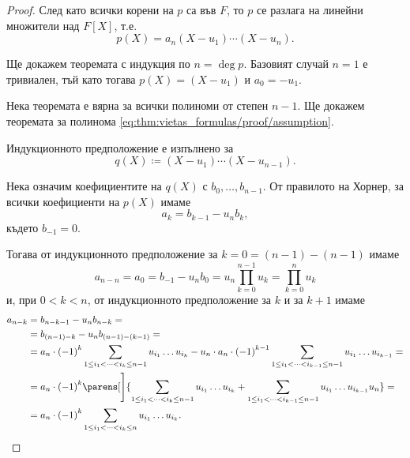 \documentclass{../../common/topic}
\begin{document}
\begin{proof}
  След като всички корени на \( p \) са във \( F \), то \( p \) се разлага на линейни множители над \( F[X] \), т.е.
  \begin{equation}\label{eq:thm:vietas_formulas/proof/assumption}
    p(X) = a_n (X - u_1) \cdots (X - u_n).
  \end{equation}

  Ще докажем теоремата с индукция по \( n = \deg p \). Базовият случай \( n = 1 \) е тривиален, тъй като тогава \( p(X) = (X - u_1) \) и \( a_0 = -u_1 \).

  Нека теоремата е вярна за всички полиноми от степен \( n - 1 \). Ще докажем теоремата за полинома \eqref{eq:thm:vietas_formulas/proof/assumption}.

  Индукционното предположение е изпълнено за
  \begin{equation*}
    q(X) \coloneqq (X - u_1) \cdots (X - u_{n-1}).
  \end{equation*}

  Нека означим коефициентите на \( q(X) \) с \( b_0, \ldots, b_{n-1} \). От правилото на Хорнер, за всички коефициенти на \( p(X) \) имаме
  \begin{equation*}
    a_k = b_{k-1} - u_n b_k,
  \end{equation*}
  където \( b_{-1} = 0 \).

  Тогава от индукционното предположение за \( k = 0 = (n - 1) - (n - 1) \) имаме
  \begin{equation*}
    a_{n-n}
    =
    a_0
    =
    b_{-1} - u_n b_0
    =
    u_n \prod_{k=0}^{n-1} u_k
    =
    \prod_{k=0}^n u_k
  \end{equation*}
  и, при \( 0 < k < n \), от индукционното предположение за \( k \) и за \( k + 1 \) имаме
  \begin{align*}
    a_{n-k}
    &=
    b_{n-k-1} - u_n b_{n-k}
    = \\ &=
    b_{(n-1)-k} - u_n b_{(n-1)-(k-1)}
    = \\ &=
    a_n \cdot {(-1)}^k \sum_{1 \leq i_1 < \cdots < i_k \leq n-1} u_{i_1} \ldots u_{i_k} - u_n \cdot a_n \cdot {(-1)}^{k-1} \sum_{1 \leq i_1 < \cdots < i_{k-1} \leq n-1} u_{i_1} \ldots u_{i_{k-1}}
    = \\ &=
    a_n \cdot {(-1)}^k \parens[\Bigg]{ \sum_{1 \leq i_1 < \cdots < i_k \leq n-1} u_{i_1} \ldots u_{i_k} + \sum_{1 \leq i_1 < \cdots < i_{k-1} \leq n-1} u_{i_1} \ldots u_{i_{k-1}} u_n }
    = \\ &=
    a_n \cdot {(-1)}^k \sum_{1 \leq i_1 < \cdots < i_k \leq n} u_{i_1} \ldots u_{i_k}.
  \end{align*}
\end{proof}
\end{document}
